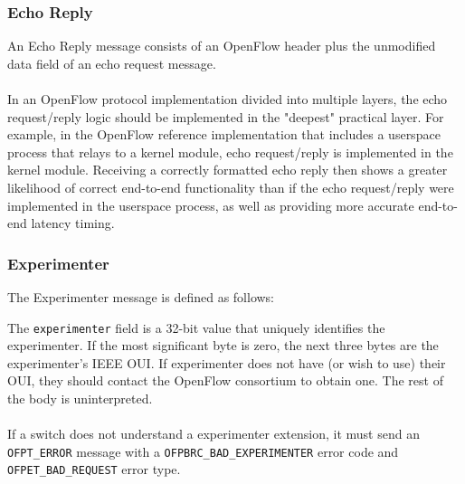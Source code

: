\subsubsection{Echo Reply}
An Echo Reply message consists of an OpenFlow header plus the unmodified data field of an echo request message.
\\\\
In an OpenFlow protocol implementation divided into multiple layers, the echo request/reply logic should be implemented in the "deepest" practical layer.  For example, in the OpenFlow reference implementation that includes a userspace process that relays to a kernel module, echo request/reply is implemented in the kernel module.  Receiving a correctly formatted echo reply then shows a greater likelihood of correct end-to-end functionality than if the echo request/reply were implemented in the userspace process, as well as providing more accurate end-to-end latency timing.

\subsubsection{Experimenter}
The Experimenter message is defined as follows:


The \verb|experimenter| field is a 32-bit value that uniquely identifies the experimenter. If the most significant byte is zero, the next three bytes are the experimenter's IEEE OUI. If experimenter does not have (or wish to use) their OUI, they should contact the OpenFlow consortium to obtain one. The rest of the body is uninterpreted.
\\\\
If a switch does not understand a experimenter extension, it must send an \verb|OFPT_ERROR| message with a \verb|OFPBRC_BAD_EXPERIMENTER| error code and \verb|OFPET_BAD_REQUEST| error type. 

